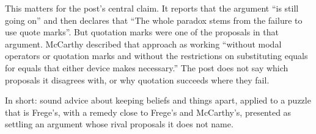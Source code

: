\begin{afterword}
This matters for the post's central claim. It reports that the argument ``is still going on'' and then declares that ``The whole paradox stems from the failure to use quote marks''. But quotation marks were one of the proposals in that argument. McCarthy described that approach as working ``without modal operators or quotation marks and without the restrictions on substituting equals for equals that either device makes necessary.'' The post does not say which proposals it disagrees with, or why quotation succeeds where they fail.

In short: sound advice about keeping beliefs and things apart, applied to a puzzle that is Frege's, with a remedy close to Frege's and McCarthy's, presented as settling an argument whose rival proposals it does not name.
\end{afterword}
